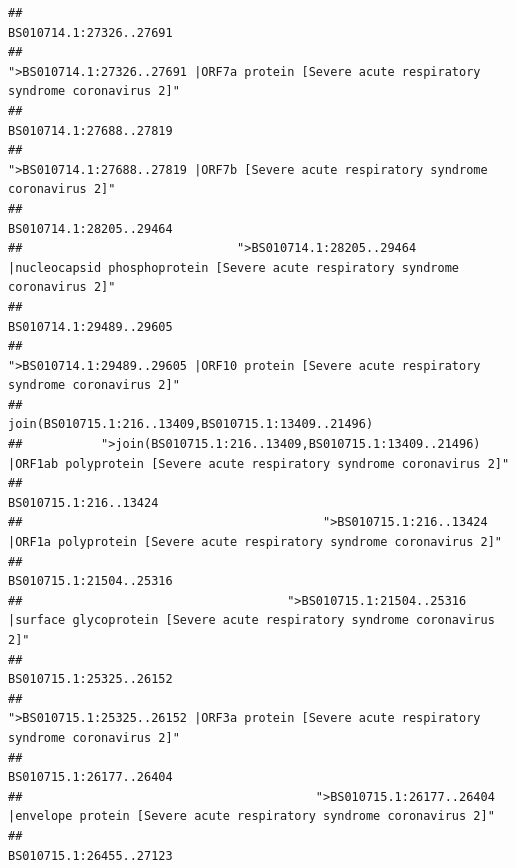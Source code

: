 \documentclass[
]{article}
\begin{document}
\begin{verbatim}
##                                                                                                                BS010714.1:27326..27691 
##                                            ">BS010714.1:27326..27691 |ORF7a protein [Severe acute respiratory syndrome coronavirus 2]" 
##                                                                                                                BS010714.1:27688..27819 
##                                                    ">BS010714.1:27688..27819 |ORF7b [Severe acute respiratory syndrome coronavirus 2]" 
##                                                                                                                BS010714.1:28205..29464 
##                              ">BS010714.1:28205..29464 |nucleocapsid phosphoprotein [Severe acute respiratory syndrome coronavirus 2]" 
##                                                                                                                BS010714.1:29489..29605 
##                                            ">BS010714.1:29489..29605 |ORF10 protein [Severe acute respiratory syndrome coronavirus 2]" 
##                                                                                    join(BS010715.1:216..13409,BS010715.1:13409..21496) 
##           ">join(BS010715.1:216..13409,BS010715.1:13409..21496) |ORF1ab polyprotein [Severe acute respiratory syndrome coronavirus 2]" 
##                                                                                                                  BS010715.1:216..13424 
##                                          ">BS010715.1:216..13424 |ORF1a polyprotein [Severe acute respiratory syndrome coronavirus 2]" 
##                                                                                                                BS010715.1:21504..25316 
##                                     ">BS010715.1:21504..25316 |surface glycoprotein [Severe acute respiratory syndrome coronavirus 2]" 
##                                                                                                                BS010715.1:25325..26152 
##                                            ">BS010715.1:25325..26152 |ORF3a protein [Severe acute respiratory syndrome coronavirus 2]" 
##                                                                                                                BS010715.1:26177..26404 
##                                         ">BS010715.1:26177..26404 |envelope protein [Severe acute respiratory syndrome coronavirus 2]" 
##                                                                                                                BS010715.1:26455..27123 

\end{verbatim}
\end{document}
